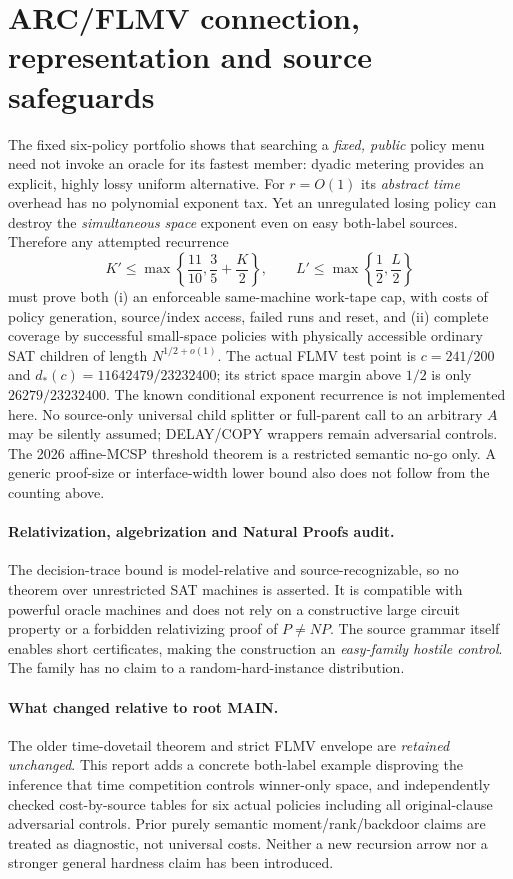 \documentclass[11pt]{article}
\begin{document}
\section{ARC/FLMV connection, representation and source safeguards}
The fixed six-policy portfolio shows that searching a \emph{fixed, public} policy menu need not invoke an oracle for its fastest member: dyadic metering provides an explicit, highly lossy uniform alternative. For $r=O(1)$ its \emph{abstract time} overhead has no polynomial exponent tax. Yet an unregulated losing policy can destroy the \emph{simultaneous space} exponent even on easy both-label sources. Therefore any attempted recurrence
\[
 K'\le\max\left\{\frac{11}{10},\frac35+\frac K2\right\},\qquad
 L'\le\max\left\{\frac12,\frac L2\right\}
\]
must prove both (i) an enforceable same-machine work-tape cap, with costs of policy generation, source/index access, failed runs and reset, and (ii) complete coverage by successful small-space policies with physically accessible ordinary SAT children of length $N^{1/2+o(1)}$. The actual FLMV test point is $c=241/200$ and $d_*(c)=11642479/23232400$; its strict space margin above $1/2$ is only $26279/23232400$. The known conditional exponent recurrence is not implemented here. No source-only universal child splitter or full-parent call to an arbitrary $A$ may be silently assumed; DELAY/COPY wrappers remain adversarial controls. The 2026 affine-MCSP threshold theorem is a restricted semantic no-go only. A generic proof-size or interface-width lower bound also does not follow from the counting above.

\paragraph{Relativization, algebrization and Natural Proofs audit.} The decision-trace bound is model-relative and source-recognizable, so no theorem over unrestricted SAT machines is asserted. It is compatible with powerful oracle machines and does not rely on a constructive large circuit property or a forbidden relativizing proof of $P\ne NP$. The source grammar itself enables short certificates, making the construction an \emph{easy-family hostile control}. The family has no claim to a random-hard-instance distribution.

\paragraph{What changed relative to root MAIN.} The older time-dovetail theorem and strict FLMV envelope are \emph{retained unchanged}. This report adds a concrete both-label example disproving the inference that time competition controls winner-only space, and independently checked cost-by-source tables for six actual policies including all original-clause adversarial controls. Prior purely semantic moment/rank/backdoor claims are treated as diagnostic, not universal costs. Neither a new recursion arrow nor a stronger general hardness claim has been introduced.
\end{document}
